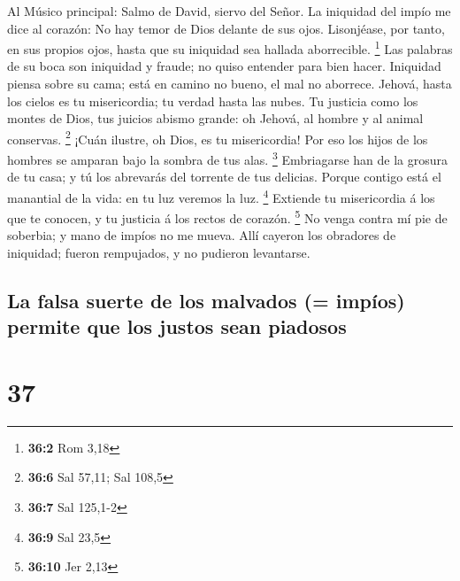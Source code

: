  Al Músico principal: Salmo de David, siervo del Señor. La
iniquidad del impío me dice al corazón: No hay temor de Dios delante de
sus ojos.  Lisonjéase, por tanto, en sus propios ojos, hasta
que su iniquidad sea hallada aborrecible. \footnote{\textbf{36:2} Rom
  3,18}  Las palabras de su boca son iniquidad y fraude; no
quiso entender para bien hacer.  Iniquidad piensa sobre su
cama; está en camino no bueno, el mal no aborrece.  Jehová,
hasta los cielos es tu misericordia; tu verdad hasta las nubes.
 Tu justicia como los montes de Dios, tus juicios abismo
grande: oh Jehová, al hombre y al animal conservas. \footnote{\textbf{36:6}
  Sal 57,11; Sal 108,5}  ¡Cuán ilustre, oh Dios, es tu
misericordia! Por eso los hijos de los hombres se amparan bajo la sombra
de tus alas. \footnote{\textbf{36:7} Sal 125,1-2} 
Embriagarse han de la grosura de tu casa; y tú los abrevarás del
torrente de tus delicias.  Porque contigo está el manantial
de la vida: en tu luz veremos la luz. \footnote{\textbf{36:9} Sal 23,5}
 Extiende tu misericordia á los que te conocen, y tu
justicia á los rectos de corazón. \footnote{\textbf{36:10} Jer 2,13}
 No venga contra mí pie de soberbia; y mano de impíos no me
mueva.  Allí cayeron los obradores de iniquidad; fueron
rempujados, y no pudieron levantarse.

\hypertarget{la-falsa-suerte-de-los-malvados-impuxedos-permite-que-los-justos-sean-piadosos}{%
\subsection{La falsa suerte de los malvados (= impíos) permite que los
justos sean
piadosos}\label{la-falsa-suerte-de-los-malvados-impuxedos-permite-que-los-justos-sean-piadosos}}

\hypertarget{section-36}{%
\section{37}\label{section-36}}


